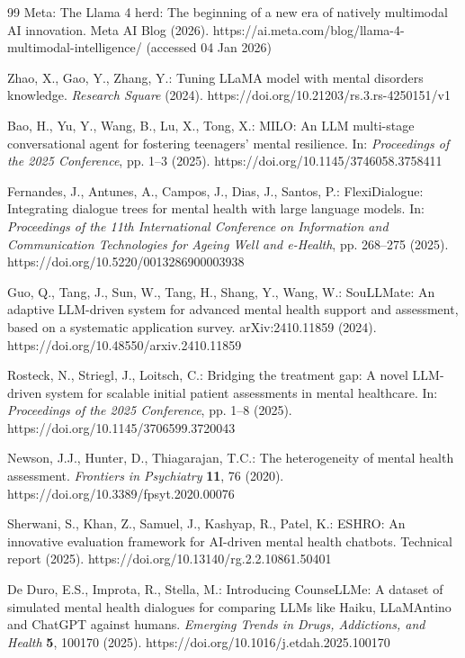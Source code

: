\documentclass{svproc}
\begin{document}
\begin{thebibliography}{99}
 Meta: The Llama 4 herd: The beginning of a new era of natively multimodal AI innovation. Meta AI Blog (2026). https://ai.meta.com/blog/llama-4-multimodal-intelligence/ (accessed 04 Jan 2026)

 Zhao, X., Gao, Y., Zhang, Y.: Tuning LLaMA model with mental disorders knowledge. \textit{Research Square} (2024). https://doi.org/10.21203/rs.3.rs-4250151/v1

 Bao, H., Yu, Y., Wang, B., Lu, X., Tong, X.: MILO: An LLM multi-stage conversational agent for fostering teenagers' mental resilience. In: \textit{Proceedings of the 2025 Conference}, pp. 1--3 (2025). https://doi.org/10.1145/3746058.3758411

 Fernandes, J., Antunes, A., Campos, J., Dias, J., Santos, P.: FlexiDialogue: Integrating dialogue trees for mental health with large language models. In: \textit{Proceedings of the 11th International Conference on Information and Communication Technologies for Ageing Well and e-Health}, pp. 268--275 (2025). https://doi.org/10.5220/0013286900003938

 Guo, Q., Tang, J., Sun, W., Tang, H., Shang, Y., Wang, W.: SouLLMate: An adaptive LLM-driven system for advanced mental health support and assessment, based on a systematic application survey. arXiv:2410.11859 (2024). https://doi.org/10.48550/arxiv.2410.11859

 Rosteck, N., Striegl, J., Loitsch, C.: Bridging the treatment gap: A novel LLM-driven system for scalable initial patient assessments in mental healthcare. In: \textit{Proceedings of the 2025 Conference}, pp. 1--8 (2025). https://doi.org/10.1145/3706599.3720043

 Newson, J.J., Hunter, D., Thiagarajan, T.C.: The heterogeneity of mental health assessment. \textit{Frontiers in Psychiatry} \textbf{11}, 76 (2020). https://doi.org/10.3389/fpsyt.2020.00076

 Sherwani, S., Khan, Z., Samuel, J., Kashyap, R., Patel, K.: ESHRO: An innovative evaluation framework for AI-driven mental health chatbots. Technical report (2025). https://doi.org/10.13140/rg.2.2.10861.50401

 De Duro, E.S., Improta, R., Stella, M.: Introducing CounseLLMe: A dataset of simulated mental health dialogues for comparing LLMs like Haiku, LLaMAntino and ChatGPT against humans. \textit{Emerging Trends in Drugs, Addictions, and Health} \textbf{5}, 100170 (2025). https://doi.org/10.1016/j.etdah.2025.100170


\end{thebibliography}
\end{document}
